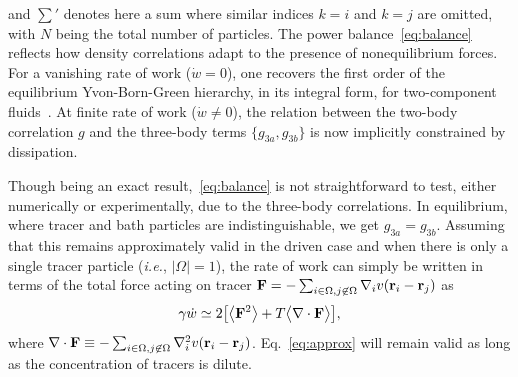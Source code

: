 \documentclass[pre, superscriptaddress, twocolumn,pre]{revtex4-1}
\begin{document}
and $\sum'$ denotes here a sum where similar indices $k=i$ and $k=j$ are omitted, with $N$ being the total number of particles. The power balance~\eqref{eq:balance} reflects how density correlations adapt to the presence of nonequilibrium forces. For a vanishing rate of work ($\dot w = 0$), one recovers the first order of the equilibrium Yvon-Born-Green hierarchy, in its integral form, for two-component fluids~\cite{Hansen2013}. At finite rate of work ($\dot w\neq0$), the relation between the two-body correlation $g$ and the three-body terms $\{g_{3a},g_{3b}\}$ is now implicitly constrained by dissipation.



Though being an exact result,~\eqref{eq:balance} is not straightforward to test, either numerically or experimentally, due to the three-body correlations. In equilibrium, where tracer and bath particles are indistinguishable, we get $g_{3a}=g_{3b}$. Assuming that this remains approximately valid in the driven case and when there is only a single tracer particle ({\it i.e.}, $|\Omega|=1$), the rate of work can simply be written in terms of the total force acting on tracer ${\bf F}=- \sum_{i\in\Omega,j\not\in\Omega}\nabla_iv({\bf r}_i-{\bf r}_j)$  as
\begin{equation}\label{eq:approx}
	\gamma\dot w \simeq 2 \big[ \big\langle{\bf F}^2\big\rangle + T \big\langle\nabla\cdot{\bf F}\big\rangle \big],
\end{equation}
where $\nabla \cdot {\bf F} \equiv - \sum_{i\in\Omega,j\not\in\Omega}\nabla_i^2v({\bf r}_i-{\bf r}_j)$. Eq.~\ref{eq:approx} will remain valid as long as the concentration of tracers is dilute. 
\end{document}
